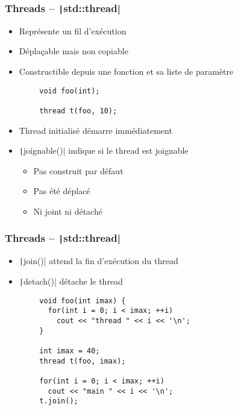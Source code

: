 \documentclass[C++.tex]{subfiles}
\begin{document}
\begin{frame}[fragile]
	\frametitle{Threads -- \texttt|std::thread|}
	\begin{itemize}
		\item Représente un fil d'exécution
		\item Déplaçable mais non copiable
		\item Constructible depuis une fonction et sa liste de paramètre
	\end{itemize}

	\begin{verbatim}
		void foo(int);

		thread t(foo, 10);
	\end{verbatim}

	\begin{itemize}
		\item Thread initialisé démarre immédiatement
		\item \texttt|joignable()| indique si le thread est joignable
		\begin{itemize}
			\item Pas construit par défaut
			\item Pas été déplacé
			\item Ni joint ni détaché
		\end{itemize}
	\end{itemize}
\end{frame}

\begin{frame}[fragile]
	\frametitle{Threads -- \texttt|std::thread|}
	\begin{itemize}
		\item \texttt|join()| attend la fin d'exécution du thread
		\item \texttt|detach()| détache le thread
	\end{itemize}

	\begin{verbatim}
		void foo(int imax) {
		  for(int i = 0; i < imax; ++i)
		    cout << "thread " << i << '\n';
		}

		int imax = 40;
		thread t(foo, imax);

		for(int i = 0; i < imax; ++i)
		  cout << "main " << i << '\n';
		t.join();
	\end{verbatim}
\end{frame}
\end{document}
